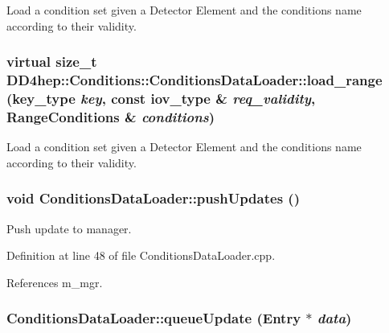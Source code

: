 Load a condition set given a Detector Element and the conditions name according to their validity. \hypertarget{class_d_d4hep_1_1_conditions_1_1_conditions_data_loader_a7c62044af7a8672ab9cb2b5bcf1022b3}{
\subsubsection[{load\_\-range}]{\setlength{\rightskip}{0pt plus 5cm}virtual size\_\-t DD4hep::Conditions::ConditionsDataLoader::load\_\-range ({\bf key\_\-type} {\em key}, \/  const {\bf iov\_\-type} \& {\em req\_\-validity}, \/  {\bf RangeConditions} \& {\em conditions})}}
\label{class_d_d4hep_1_1_conditions_1_1_conditions_data_loader_a7c62044af7a8672ab9cb2b5bcf1022b3}


Load a condition set given a Detector Element and the conditions name according to their validity. \hypertarget{class_d_d4hep_1_1_conditions_1_1_conditions_data_loader_a65ad637b1fa714f1d3b784fdfcdccd37}{
\subsubsection[{pushUpdates}]{\setlength{\rightskip}{0pt plus 5cm}void ConditionsDataLoader::pushUpdates ()}}
\label{class_d_d4hep_1_1_conditions_1_1_conditions_data_loader_a65ad637b1fa714f1d3b784fdfcdccd37}


Push update to manager. 

Definition at line 48 of file ConditionsDataLoader.cpp.

References m\_\-mgr.\hypertarget{class_d_d4hep_1_1_conditions_1_1_conditions_data_loader_a1538131327aebb04c554cecf4c512bb7}{
\subsubsection[{queueUpdate}]{ ConditionsDataLoader::queueUpdate ({\bf Entry} $\ast$ {\em data})}}
\label{class_d_d4hep_1_1_conditions_1_1_conditions_data_loader_a1538131327aebb04c554cecf4c512bb7}


